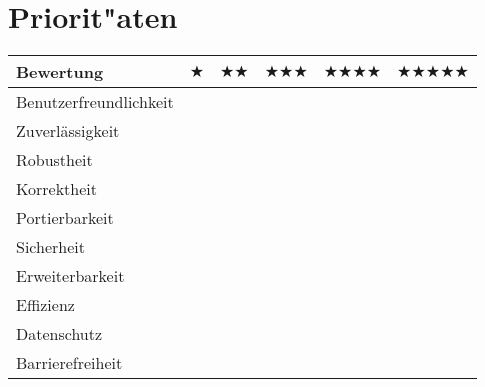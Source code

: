 %
%

%
%
\section{Priorit{"a}ten}
\label{QS:Prioritaeten}

\begin{center}
	
	
	\setlength{\LTleft}{-20cm plus -1fill}
	\setlength{\LTright}{\LTleft}
	
	\begin{longtable}{|l|c|c|c|c|c|}
	
	
		\hline 
		
		Bewertung & $\bigstar$ & 
		$\bigstar\bigstar$ & 
		$\bigstar\bigstar\bigstar$ & 
		$\bigstar\bigstar\bigstar\bigstar$ &
		$\bigstar\bigstar\bigstar\bigstar\bigstar$ \\
		
		\hline
		\hline
		
		Benutzerfreundlichkeit &  &  &  &  &  \\
		
		\hline
		
		Zuverlässigkeit &  &  &  &  &  \\
				
		\hline

		Robustheit &  &  &  &  &  \\
		
		\hline

		Korrektheit &  &  &  &  &  \\
		
		\hline

		Portierbarkeit &  &  &  &  &  \\
		
		\hline

		Sicherheit &  &  &  &  &  \\
		
		\hline

		Erweiterbarkeit &  &  &  &  &  \\
		
		\hline

		Effizienz &  &  &  &  &  \\
		
		\hline

		Datenschutz &  &  &  &  &  \\
		
		\hline
		
		Barrierefreiheit &  &  &  &  &  \\
				

\end{longtable}
\end{center}
